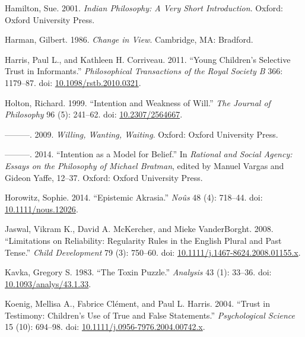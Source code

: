 \documentclass[
  11pt,
  letterpaper,
  DIV=11,
  numbers=noendperiod,
  twoside]{scrartcl}
\newlength{\cslhangindent}
\newenvironment{CSLReferences}[2] %
 {\begin{list}{}{%
  \setlength{\itemindent}{0pt}
  \setlength{\leftmargin}{0pt}
  \setlength{\parsep}{0pt}
  \ifodd #1
   \setlength{\leftmargin}{\cslhangindent}
   \setlength{\itemindent}{-1\cslhangindent}
  \fi
  \setlength{\itemsep}{#2\baselineskip}}}
 {\end{list}}
\begin{document}
\begin{CSLReferences}{1}{0}
Hamilton, Sue. 2001. \emph{Indian Philosophy: A Very Short
Introduction}. Oxford: {O}xford {U}niversity {P}ress.

Harman, Gilbert. 1986. \emph{Change in View}. Cambridge, MA: Bradford.

Harris, Paul L., and Kathleen H. Corriveau. 2011. {``Young Children's
Selective Trust in Informants.''} \emph{Philosophical Transactions of
the Royal Society B} 366: 1179--87. doi:
\href{https://doi.org/10.1098/rstb.2010.0321}{10.1098/rstb.2010.0321}.

Holton, Richard. 1999. {``Intention and Weakness of Will.''} \emph{The
Journal of Philosophy} 96 (5): 241--62. doi:
\href{https://doi.org/10.2307/2564667}{10.2307/2564667}.

---------. 2009. \emph{Willing, Wanting, Waiting}. Oxford: Oxford
University Press.

---------. 2014. {``Intention as a Model for Belief.''} In
\emph{Rational and Social Agency: Essays on the Philosophy of Michael
Bratman}, edited by Manuel Vargas and Gideon Yaffe, 12--37. Oxford:
Oxford University Press.

Horowitz, Sophie. 2014. {``Epistemic Akrasia.''} \emph{No{û}s} 48 (4):
718--44. doi:
\href{https://doi.org/10.1111/nous.12026}{10.1111/nous.12026}.

Jaswal, Vikram K., David A. McKercher, and Mieke VanderBorght. 2008.
{``Limitations on Reliability: Regularity Rules in the English Plural
and Past Tense.''} \emph{Child Development} 79 (3): 750--60. doi:
\href{https://doi.org/10.1111/j.1467-8624.2008.01155.x}{10.1111/j.1467-8624.2008.01155.x}.

Kavka, Gregory S. 1983. {``The Toxin Puzzle.''} \emph{Analysis} 43 (1):
33--36. doi:
\href{https://doi.org/10.1093/analys/43.1.33}{10.1093/analys/43.1.33}.

Koenig, Mellisa A., Fabrice Clément, and Paul L. Harris. 2004. {``Trust
in Testimony: Children's Use of True and False Statements.''}
\emph{Psychological Science} 15 (10): 694--98. doi:
\href{https://doi.org/10.1111/j.0956-7976.2004.00742.x}{10.1111/j.0956-7976.2004.00742.x}.


\end{CSLReferences}
\end{document}
